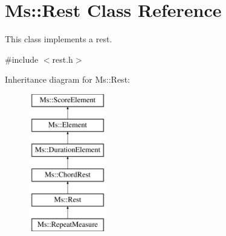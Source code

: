 \hypertarget{class_ms_1_1_rest}{}\section{Ms\+:\+:Rest Class Reference}
\label{class_ms_1_1_rest}


This class implements a rest.  




{\ttfamily \#include $<$rest.\+h$>$}

Inheritance diagram for Ms\+:\+:Rest\+:\begin{figure}[H]
\begin{center}
\leavevmode
\includegraphics[height=6.000000cm]{class_ms_1_1_rest}
\end{center}
\end{figure}
